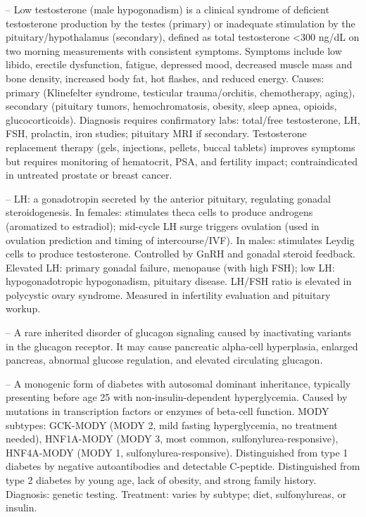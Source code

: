 -- Low testosterone (male hypogonadism) is a clinical syndrome of deficient testosterone production by the testes (primary) or inadequate stimulation by the pituitary/hypothalamus (secondary), defined as total testosterone <300 ng/dL on two morning measurements with consistent symptoms. Symptoms include low libido, erectile dysfunction, fatigue, depressed mood, decreased muscle mass and bone density, increased body fat, hot flashes, and reduced energy. Causes: primary (Klinefelter syndrome, testicular trauma/orchitis, chemotherapy, aging), secondary (pituitary tumors, hemochromatosis, obesity, sleep apnea, opioids, glucocorticoids). Diagnosis requires confirmatory labs: total/free testosterone, LH, FSH, prolactin, iron studies; pituitary MRI if secondary. Testosterone replacement therapy (gels, injections, pellets, buccal tablets) improves symptoms but requires monitoring of hematocrit, PSA, and fertility impact; contraindicated in untreated prostate or breast cancer.

-- LH: a gonadotropin secreted by the anterior pituitary, regulating gonadal steroidogenesis. In females: stimulates theca cells to produce androgens (aromatized to estradiol); mid-cycle LH surge triggers ovulation (used in ovulation prediction and timing of intercourse/IVF). In males: stimulates Leydig cells to produce testosterone. Controlled by GnRH and gonadal steroid feedback. Elevated LH: primary gonadal failure, menopause (with high FSH); low LH: hypogonadotropic hypogonadism, pituitary disease. LH/FSH ratio is elevated in polycystic ovary syndrome. Measured in infertility evaluation and pituitary workup.

-- A rare inherited disorder of glucagon signaling caused by inactivating variants in the glucagon receptor. It may cause pancreatic alpha-cell hyperplasia, enlarged pancreas, abnormal glucose regulation, and elevated circulating glucagon.

-- A monogenic form of diabetes with autosomal dominant inheritance, typically presenting before age 25 with non-insulin-dependent hyperglycemia. Caused by mutations in transcription factors or enzymes of beta-cell function. MODY subtypes: GCK-MODY (MODY 2, mild fasting hyperglycemia, no treatment needed), HNF1A-MODY (MODY 3, most common, sulfonylurea-responsive), HNF4A-MODY (MODY 1, sulfonylurea-responsive). Distinguished from type 1 diabetes by negative autoantibodies and detectable C-peptide. Distinguished from type 2 diabetes by young age, lack of obesity, and strong family history. Diagnosis: genetic testing. Treatment: varies by subtype; diet, sulfonylureas, or insulin.

